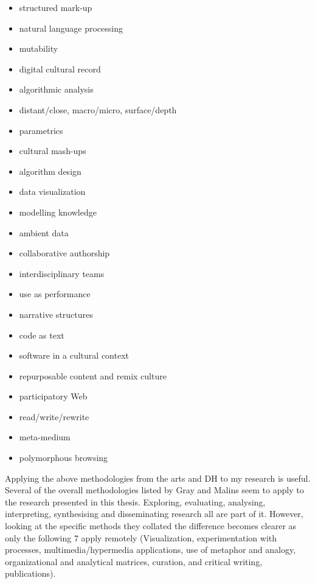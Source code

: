\begin{multicols}{2}\raggedright
\begin{itemize}
  \item structured mark-up
  \item	natural language processing
  \item	mutability
  \item	digital cultural record
  \item	algorithmic analysis
  \item distant/close, macro/micro, surface/depth
  \item parametrics
  \item	cultural mash-ups
  \item	algorithm design
  \item data visualization
  \item	modelling knowledge
  \item	ambient data
  \item	collaborative authorship
  \item	interdisciplinary teams
  \item	use as performance
  \item narrative structures
  \item	code as text
  \item	software in a cultural context
  \item repurposable content and remix culture
  \item participatory Web
  \item	read/write/rewrite
  \item	meta-medium
  \item	polymorphous browsing
\end{itemize}
\end{multicols}

\spirals

Applying the above methodologies from the arts and \ac{DH} to my research is useful. Several of the overall methodologies listed by Gray and Malins \citeyear{Gray2004} seem to apply to the research presented in this thesis. Exploring, evaluating, analysing, interpreting, synthesising and disseminating research all are part of it. However, looking at the specific methods they collated the difference becomes clearer as only the following 7 apply remotely (Visualization, experimentation with processes, multimedia/hypermedia applications, use of metaphor and analogy, organizational and analytical matrices, curation, and critical writing, publications).

